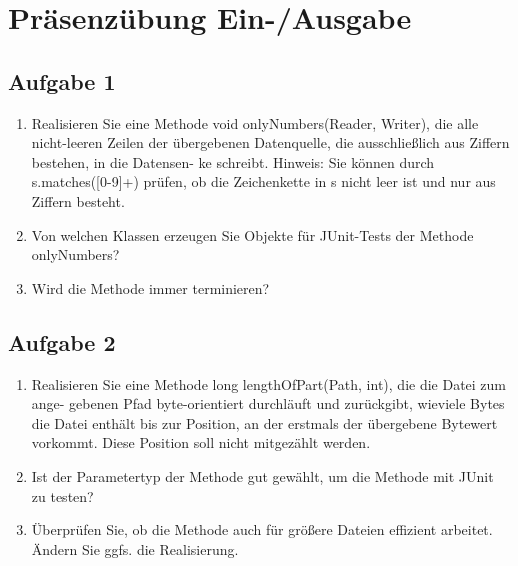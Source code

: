 \chapter{Präsenzübung Ein-/Ausgabe}

\section{Aufgabe 1}

\begin{enumerate}
    \item Realisieren Sie eine Methode void onlyNumbers(Reader, Writer), die alle nicht-leeren
Zeilen der übergebenen Datenquelle, die ausschließlich aus Ziffern bestehen, in die Datensen-
ke schreibt.
Hinweis: Sie können durch s.matches([0-9]+) prüfen, ob die Zeichenkette in s nicht leer
ist und nur aus Ziffern besteht.
\item Von welchen Klassen erzeugen Sie Objekte für JUnit-Tests der Methode onlyNumbers?
\item Wird die Methode immer terminieren?
\end{enumerate}

\section{Aufgabe 2}
\begin{enumerate}
    \item Realisieren Sie eine Methode long lengthOfPart(Path, int), die die Datei zum ange-
gebenen Pfad byte-orientiert durchläuft und zurückgibt, wieviele Bytes die Datei enthält bis
zur Position, an der erstmals der übergebene Bytewert vorkommt. Diese Position soll nicht
mitgezählt werden.
\item Ist der Parametertyp der Methode gut gewählt, um die Methode mit JUnit zu testen?
\item Überprüfen Sie, ob die Methode auch für größere Dateien effizient arbeitet. Ändern Sie ggfs.
die Realisierung.
\end{enumerate}